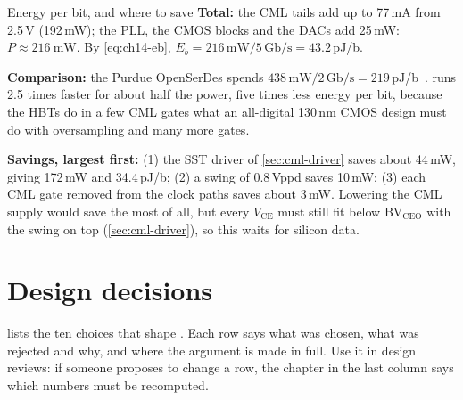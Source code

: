 \begin{example}{Energy per bit, and where to save}\label{we:ch14-power}
\textbf{Total:} the CML tails add up to 77\,mA from 2.5\,V (192\,mW); the PLL, the CMOS blocks and the DACs add 25\,mW: $P\approx\qty{216}{\milli\watt}$. By \cref{eq:ch14-eb}, $E_b = 216\,\mathrm{mW}/5\,\mathrm{Gb/s} = \mathbf{43.2}$\,pJ/b.

\textbf{Comparison:} the Purdue OpenSerDes spends $438\,\mathrm{mW}/2\,\mathrm{Gb/s} = 219$\,pJ/b~\cite{openserdes2021}. \OS{} runs 2.5 times faster for about half the power, five times less energy per bit, because the HBTs do in a few CML gates what an all-digital 130\,nm CMOS design must do with oversampling and many more gates.

\textbf{Savings, largest first:} (1) the SST driver of \cref{sec:cml-driver} saves about 44\,mW, giving 172\,mW and 34.4\,pJ/b; (2) a swing of 0.8\,Vppd saves 10\,mW; (3) each CML gate removed from the clock paths saves about 3\,mW. Lowering the CML supply would save the most of all, but every $V_\mathrm{CE}$ must still fit below $\mathrm{BV}_\mathrm{CEO}$ with the swing on top (\cref{sec:cml-driver}), so this waits for silicon data.
\end{example}


\section{Design decisions}\label{sec:ch14-decisions}

 lists the ten choices that shape \OS{}. Each row says what was chosen, what was rejected and why, and where the argument is made in full. Use it in design reviews: if someone proposes to change a row, the chapter in the last column says which numbers must be recomputed.

